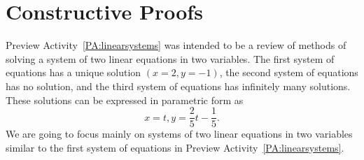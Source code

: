 \section{Constructive Proofs} \label{S:constructive}
\setcounter{previewactivity}{0}
%

%
Preview Activity~\ref{PA:linearsystems} was intended to be a review of methods of solving a system of two linear equations in two variables.  The first system of equations has a unique solution $\left( {x = 2,y =  - 1} \right)$, the second system of equations has no solution, and the third system of equations has infinitely many solutions.  These solutions can be expressed in parametric form as
\[
x = t,y = \frac{2}{5}t - \frac{1}{5}.
\]
We are going to focus mainly on systems of two linear equations in two variables similar to the first system of equations in Preview Activity~\ref{PA:linearsystems}.

